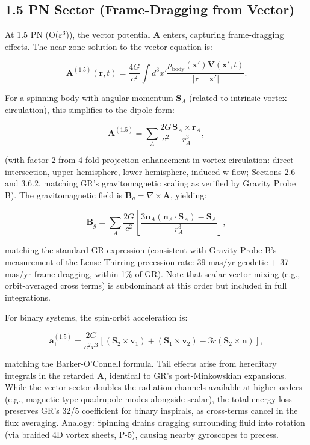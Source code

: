 \documentclass{article}
\begin{document}
\subsection{1.5 PN Sector (Frame-Dragging from Vector)}

At 1.5 PN (O($\varepsilon^3$)), the vector potential $\mathbf{A}$ enters, capturing frame-dragging effects. The near-zone solution to the vector equation is:

\[
\mathbf{A}^{(1.5)}(\mathbf{r}, t) = \frac{4 G}{c^2} \int d^3 x' \frac{\rho_{\text{body}}(\mathbf{x}') \mathbf{V}(\mathbf{x}', t)}{|\mathbf{r} - \mathbf{x}'|}.
\]

For a spinning body with angular momentum $\mathbf{S}_A$ (related to intrinsic vortex circulation), this simplifies to the dipole form:

\[
\mathbf{A}^{(1.5)} = \sum_A \frac{2 G}{c^2} \frac{\mathbf{S}_A \times \mathbf{r}_A}{r_A^3},
\]

(with factor 2 from 4-fold projection enhancement in vortex circulation: direct intersection, upper hemisphere, lower hemisphere, induced w-flow; Sections 2.6 and 3.6.2, matching GR's gravitomagnetic scaling as verified by Gravity Probe B). The gravitomagnetic field is $\mathbf{B}_g = \nabla \times \mathbf{A}$, yielding:

\[
\mathbf{B}_g = \sum_A \frac{2 G}{c^2} \left[ \frac{3 \mathbf{n}_A (\mathbf{n}_A \cdot \mathbf{S}_A) - \mathbf{S}_A}{r_A^3} \right],
\]

matching the standard GR expression (consistent with Gravity Probe B's measurement of the Lense-Thirring precession rate: 39 mas/yr geodetic + 37 mas/yr frame-dragging, within 1\% of GR). Note that scalar-vector mixing (e.g., orbit-averaged cross terms) is subdominant at this order but included in full integrations.

For binary systems, the spin-orbit acceleration is:

\[
\mathbf{a}_1^{(1.5)} = \frac{2G}{c^2 r^3} [ (\mathbf{S}_2 \times \mathbf{v}_1) + (\mathbf{S}_1 \times \mathbf{v}_2) - 3 \dot{r} (\mathbf{S}_2 \times \mathbf{n}) ],
\]

matching the Barker-O'Connell formula. Tail effects arise from hereditary integrals in the retarded $\mathbf{A}$, identical to GR's post-Minkowskian expansions. While the vector sector doubles the radiation channels available at higher orders (e.g., magnetic-type quadrupole modes alongside scalar), the total energy loss preserves GR's 32/5 coefficient for binary inspirals, as cross-terms cancel in the flux averaging. Analogy: Spinning drains dragging surrounding fluid into rotation (via braided 4D vortex sheets, P-5), causing nearby gyroscopes to precess.
\end{document}

